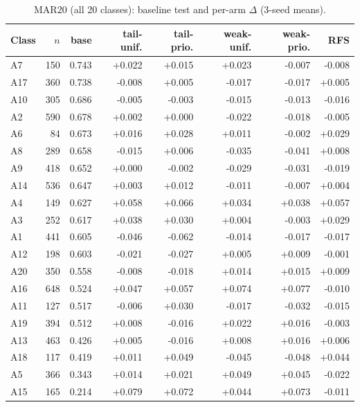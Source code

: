 \begin{table}[h]\centering\small\caption{MAR20 (all 20 classes): baseline test \mapm{} and per-arm $\Delta$ (3-seed means).}\label{tab:pc-mar20}
\begin{tabular}{lrrrrrrr}\toprule
Class & $n$ & base & tail-unif. & tail-prio. & weak-unif. & weak-prio. & RFS \\ \midrule
A7 & 150 & 0.743 & +0.022 & +0.015 & +0.023 & -0.007 & -0.008 \\
A17 & 360 & 0.738 & -0.008 & +0.005 & -0.017 & -0.017 & +0.005 \\
A10 & 305 & 0.686 & -0.005 & -0.003 & -0.015 & -0.013 & -0.016 \\
A2 & 590 & 0.678 & +0.002 & +0.000 & -0.022 & -0.018 & -0.005 \\
A6 & 84 & 0.673 & +0.016 & +0.028 & +0.011 & -0.002 & +0.029 \\
A8 & 289 & 0.658 & -0.015 & +0.006 & -0.035 & -0.041 & +0.008 \\
A9 & 418 & 0.652 & +0.000 & -0.002 & -0.029 & -0.031 & -0.019 \\
A14 & 536 & 0.647 & +0.003 & +0.012 & -0.011 & -0.007 & +0.004 \\
A4 & 149 & 0.627 & +0.058 & +0.066 & +0.034 & +0.038 & +0.057 \\
A3 & 252 & 0.617 & +0.038 & +0.030 & +0.004 & -0.003 & +0.029 \\
A1 & 441 & 0.605 & -0.046 & -0.062 & -0.014 & -0.017 & -0.017 \\
A12 & 198 & 0.603 & -0.021 & -0.027 & +0.005 & +0.009 & -0.001 \\
A20 & 350 & 0.558 & -0.008 & -0.018 & +0.014 & +0.015 & +0.009 \\
A16 & 648 & 0.524 & +0.047 & +0.057 & +0.074 & +0.077 & -0.010 \\
A11 & 127 & 0.517 & -0.006 & +0.030 & -0.017 & -0.032 & -0.015 \\
A19 & 394 & 0.512 & +0.008 & -0.016 & +0.022 & +0.016 & -0.003 \\
A13 & 463 & 0.426 & +0.005 & -0.016 & +0.008 & +0.016 & +0.006 \\
A18 & 117 & 0.419 & +0.011 & +0.049 & -0.045 & -0.048 & +0.044 \\
A5 & 366 & 0.343 & +0.014 & +0.021 & +0.049 & +0.045 & -0.022 \\
A15 & 165 & 0.214 & +0.079 & +0.072 & +0.044 & +0.073 & -0.011 \\
\bottomrule\end{tabular}\end{table}
